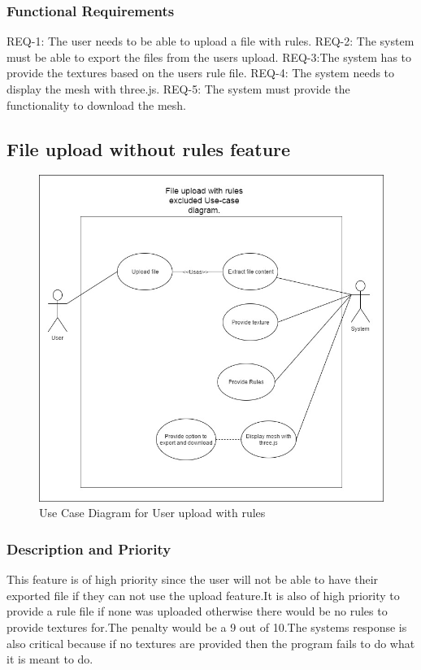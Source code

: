 \documentclass[english]{article}
\begin{document}
			 \subsubsection{Functional Requirements}
			 	REQ-1: The user needs to be able to upload a file with rules.
			 	REQ-2: The system must be able to export the files from the users upload.
			 	REQ-3:The system has to provide the textures based on the users rule file.
			 	REQ-4: The system needs to display the mesh with three.js.
			 	REQ-5: The system must provide the functionality to download the mesh.
			 \subsection{File upload without rules feature}
				\begin{figure}[h]
					\includegraphics[width=\textwidth]{norules.jpg}
					\caption{Use Case Diagram for User upload with rules }
				\end{figure}
			 \subsubsection{Description and Priority}
			 This feature is of high priority since the user will not be able to have their exported file if they can not use the upload feature.It is also of high priority to provide a rule file if none was uploaded otherwise there would be no rules to provide textures for.The penalty would be a 9 out of 10.The systems response is also critical because if no textures are provided then the program fails to do what it is meant to do. 
\end{document}

